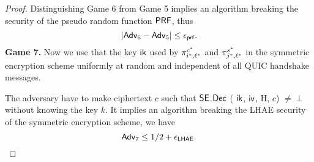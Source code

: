 \begin{proof}
 Distinguishing Game 6 from Game 5 implies an algorithm breaking the security of the pseudo random function $\mathsf{PRF}$, thus
 \begin{equation}
  |\mathsf{Adv}_6 - \mathsf{Adv}_5| \leq \epsilon_{\mathsf{prf}}.
 \end{equation}%
%
%
 \textbf{Game 7.} Now we use that the key $\mathsf{ik}$ used by $\pi^{c^{\ast}}_{i^{\ast},\ell^{\ast}}$ and $\pi^{s^{\ast}}_{j^{\ast},\ell^{\ast}}$ in the symmetric encryption scheme uniformly at random and independent of all QUIC handshake messages.

 The adversary have to make ciphertext $c$ such that $\mathsf{SE}$.$\mathsf{Dec}$ ( $\mathsf{ik}$, $\mathsf{iv}$, H, $c$) $\neq \perp$ without knowing the key $k$. It implies an algorithm breaking the LHAE security of the symmetric encryption scheme, we have
 \begin{equation}
  \mathsf{Adv}_7 \leq 1/2 + \epsilon_{\mathsf{LHAE}}.
 \end{equation}%
\end{proof}